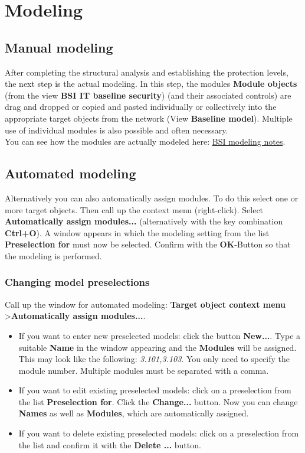 \documentclass[a4paper,10pt]{book}
\begin{document}
\section{Modeling}
\subsection{Manual modeling}
After completing the structural analysis and establishing the protection levels, the next step is the actual modeling. In this step,
the modules \textbf{Module objects} (from the view \textbf{BSI IT baseline security}) (and their associated controls) are drag and dropped or copied and pasted
individually or collectively into the appropriate target objects from the network (View \textbf{Baseline model}).
Multiple use of individual modules is also possible and often necessary.
\newline\\
You can see how the modules are actually modeled here:
\href{https://www.bsi.bund.de/ContentBSI/grundschutz/kataloge/allgemein/modellierung/02001.html}{BSI modeling notes}.

\subsection{Automated modeling}
Alternatively you can also automatically assign modules. To do this select one or more target objects.
Then call up the context menu (right-click). Select \textbf{Automatically assign modules...}
(alternatively with the key combination \textbf{Ctrl+O}). A window appears in which the modeling setting from the list
\textbf{Preselection for} must now be selected. Confirm with the \textbf{OK}-Button so that the modeling is performed.

\subsubsection{Changing model preselections}
Call up the window for automated modeling: \textbf{Target object context menu} \textgreater \textbf{Automatically assign modules...}.
\begin{itemize}
 \item If you want to enter new preselected models: click the button \textbf{New...}. Type a suitable \textbf{Name} in the window appearing and the \textbf{Modules} will be assigned. This may look like the following: \textit{3.101,3.103}. You only need to specify the module number. Multiple modules must be separated with a comma.
 \item If you want to edit existing preselected models: click on a preselection from the list \textbf{Preselection for}. Click the \textbf{Change...} button. Now you can change \textbf{Names} as well as \textbf{Modules}, which are automatically assigned.
 \item If you want to delete existing preselected models: click on a preselection from the list and confirm it with the \textbf{Delete ...} button.
\end{itemize}
\end{document}

